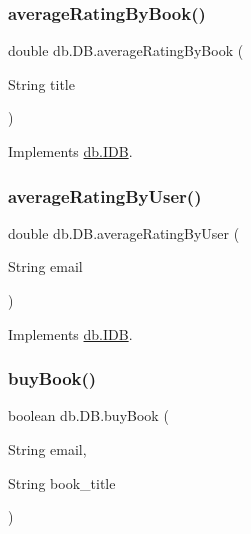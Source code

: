 \subsubsection{\texorpdfstring{average\+Rating\+By\+Book()}{averageRatingByBook()}}
{\footnotesize\ttfamily double db.\+D\+B.\+average\+Rating\+By\+Book (\begin{DoxyParamCaption}\item[{String}]{title }\end{DoxyParamCaption})}



Implements \hyperlink{interfacedb_1_1_i_d_b_a4d23da2e383e7fe0638089fb2686b6c3}{db.\+I\+DB}.

\mbox{\label{classdb_1_1_d_b_a38091677ae1e964a84320d6e539ea62e}} 
\subsubsection{\texorpdfstring{average\+Rating\+By\+User()}{averageRatingByUser()}}
{\footnotesize\ttfamily double db.\+D\+B.\+average\+Rating\+By\+User (\begin{DoxyParamCaption}\item[{String}]{email }\end{DoxyParamCaption})}



Implements \hyperlink{interfacedb_1_1_i_d_b_a5bb2209c976ab0a7f20606ed5df0e0cf}{db.\+I\+DB}.

\mbox{\label{classdb_1_1_d_b_a8a1a15bae4352c3c73092d801ef26c41}} 
\subsubsection{\texorpdfstring{buy\+Book()}{buyBook()}}
{\footnotesize\ttfamily boolean db.\+D\+B.\+buy\+Book (\begin{DoxyParamCaption}\item[{String}]{email,  }\item[{String}]{book\+\_\+title }\end{DoxyParamCaption})}



